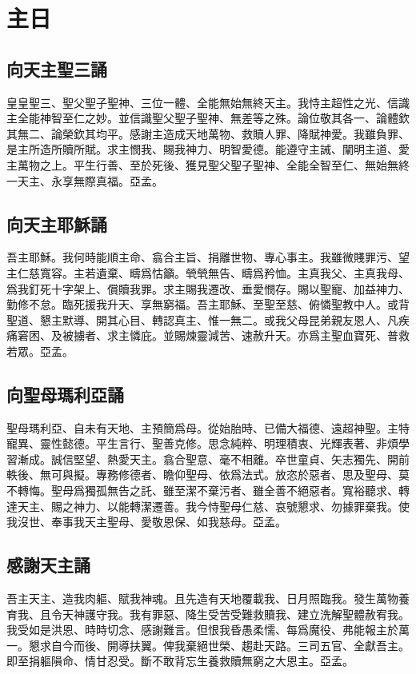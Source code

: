 \chapter[主日經]{主日}
\section*{向天主聖三誦}
皇皇聖三、聖父聖子聖神、三位一體、全能無始無終天主。我恃主超性之光、信識主全能神智至仁之妙。並信識聖父聖子聖神、無差等之殊。論位敬其各一、論體欽其無二、論榮欽其均平。感謝主造成天地萬物、救贖人罪、降賦神愛。我雖負罪、是主所造所贖所賦。求主憫我、賜我神力、明智愛德。能遵守主誡、闡明主道、愛主萬物之上。平生行善、至於死後、獲見聖父聖子聖神、全能全智至仁、無始無終一天主、永享無際真福。{\cspace}亞孟。
\section*{向天主耶穌誦}
吾主耶穌。我何時能順主命、翕合主旨、捐離世物、專心事主。我雖微賤罪污、望主仁慈寬容。主若遺棄、疇爲怙籲。煢煢無告、疇爲矜恤。主真我父、主真我母、爲我釘死十字架上、償贖我罪。求主賜我遷改、垂愛憫存。賜以聖寵、加益神力、勤修不怠。臨死援我升天、享無窮福。吾主耶穌、至聖至慈、俯憐聖教中人。或背聖道、懇主默導、開其心目、轉認真主、惟一無二。或我父母昆弟親友恩人、凡疾痛窘困、及被擄者、求主憐庇。並賜煉靈減苦、速赦升天。亦爲主聖血寶死、普救若眾。{\cspace}亞孟。
\section*{向聖母瑪利亞誦}
聖母瑪利亞、自未有天地、主預簡爲母。從始胎時、已備大福德、遠超神聖。主特寵異、靈性懿德。平生言行、聖善克修。思念純粹、明理積衷、光輝表著、非煩學習漸成。誠信堅望、熱愛天主。翕合聖意、毫不相離。卒世童貞、矢志獨先、開前軼後、無可與擬。專務修德者、瞻仰聖母、依爲法式。放恣於惡者、思及聖母、莫不轉悔。聖母爲獨孤無告之託、雖至潔不棄污者、雖全善不絕惡者。寬裕聽求、轉達天主、賜之神力、以能轉潔遷善。我今恃聖母仁慈、哀號懇求、勿據罪棄我。使我沒世、奉事我天主聖母、愛敬恩保、如我慈母。{\cspace}亞孟。
\section*{感謝天主誦}
吾主天主、造我肉軀、賦我神魂。且先造有天地覆載我、日月照臨我。發生萬物養育我、且令天神護守我。我有罪惡、降生受苦受難救贖我、建立洗解聖體赦宥我。我受如是洪恩、時時切念、感謝難言。但恨我昏愚柔懦、每爲魔役、弗能報主於萬一。懇求自今而後、開導扶翼。俾我棄絕世榮、趨赴天路。三司五官、全獻吾主。即至捐軀隕命、情甘忍受。斷不敢背忘生養救贖無窮之大恩主。{\cspace}亞孟。
